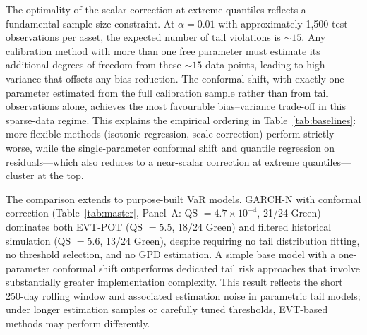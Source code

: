 \documentclass[preprint,11pt,authoryear]{elsarticle}
\newcommand{\1}{\boldsymbol{1}}
\begin{document}
	The optimality of the scalar correction at extreme quantiles
	reflects a fundamental sample-size constraint. At
	$\alpha = 0.01$ with approximately 1{,}500 test observations
	per asset, the expected number of tail violations is
	${\sim}15$. Any calibration method with more than one free
	parameter must estimate its additional degrees of freedom from
	these ${\sim}15$ data points, leading to high variance that
	offsets any bias reduction. The conformal shift, with exactly
	one parameter estimated from the full calibration sample rather
	than from tail observations alone, achieves the most favourable
	bias--variance trade-off in this sparse-data regime. This
	explains the empirical ordering in
	Table~\ref{tab:baselines}: more flexible methods (isotonic
	regression, scale correction) perform strictly worse, while the
	single-parameter conformal shift and quantile regression on
	residuals---which also reduces to a near-scalar correction at
	extreme quantiles---cluster at the top.

	The comparison extends to purpose-built VaR models. GARCH-N with
	conformal correction (Table~\ref{tab:master}, Panel~A:
	QS $= 4.7 \times 10^{-4}$, 21/24 Green) dominates both EVT-POT
	(QS $= 5.5$, 18/24 Green) and filtered historical simulation
	(QS $= 5.6$, 13/24 Green), despite requiring no tail
	distribution fitting, no threshold selection, and no GPD
	estimation. A simple base model with a one-parameter conformal
	shift outperforms dedicated tail risk approaches that involve
	substantially greater implementation complexity.
	This result reflects the short 250-day rolling window and associated estimation noise in parametric tail models; under longer estimation samples or carefully tuned thresholds, EVT-based methods may perform differently.
\end{document}
